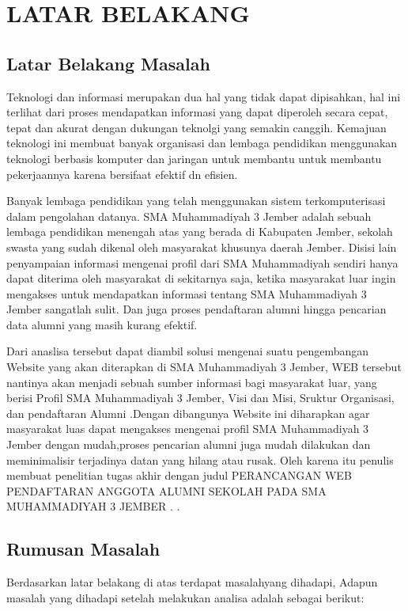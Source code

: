 \documentclass{jtetiproposalskripsi}
\begin{document}
\chapter{LATAR BELAKANG}

\section{Latar Belakang Masalah}
Teknologi dan informasi merupakan dua hal yang tidak dapat dipisahkan, hal ini terlihat dari proses mendapatkan informasi yang dapat diperoleh secara cepat, tepat dan akurat dengan dukungan teknolgi yang semakin canggih. Kemajuan teknologi ini membuat banyak organisasi dan lembaga pendidikan menggunakan teknologi berbasis komputer dan jaringan untuk membantu untuk membantu pekerjaannya karena bersifaat efektif dn efisien. 

Banyak lembaga pendidikan yang telah menggunakan sistem terkomputerisasi dalam pengolahan datanya. SMA Muhammadiyah 3 Jember adalah sebuah lembaga pendidikan menengah atas yang berada di Kabupaten Jember, sekolah swasta yang sudah dikenal oleh masyarakat khusunya daerah Jember. Disisi lain penyampaian informasi mengenai profil dari SMA Muhammadiyah sendiri hanya dapat diterima oleh masyarakat di sekitarnya saja, ketika masyarakat luar ingin mengakses untuk mendapatkan informasi tentang SMA Muhammadiyah 3 Jember sangatlah sulit. Dan juga proses pendaftaran alumni hingga pencarian data alumni yang masih kurang efektif.

Dari anaslisa tersebut dapat diambil solusi mengenai suatu pengembangan Website yang akan diterapkan di SMA Muhammadiyah 3 Jember, WEB tersebut nantinya akan menjadi sebuah sumber informasi bagi masyarakat luar, yang  berisi Profil SMA Muhammadiyah 3 Jember, Visi dan Misi, Sruktur Organisasi, dan pendaftaran Alumni .Dengan dibangunya Website ini diharapkan agar masyarakat luas dapat mengakses mengenai profil SMA Muhammadiyah 3 Jember dengan mudah,proses pencarian alumni juga mudah dilakukan dan meminimalisir terjadinya datan yang hilang atau rusak. Oleh karena itu penulis membuat penelitian tugas akhir dengan judul  PERANCANGAN WEB PENDAFTARAN ANGGOTA ALUMNI SEKOLAH PADA SMA MUHAMMADIYAH 3 JEMBER .
.

\section{Rumusan Masalah}
Berdasarkan latar belakang di atas terdapat masalahyang dihadapi, Adapun masalah yang dihadapi setelah melakukan analisa adalah sebagai berikut:
\end{document}
